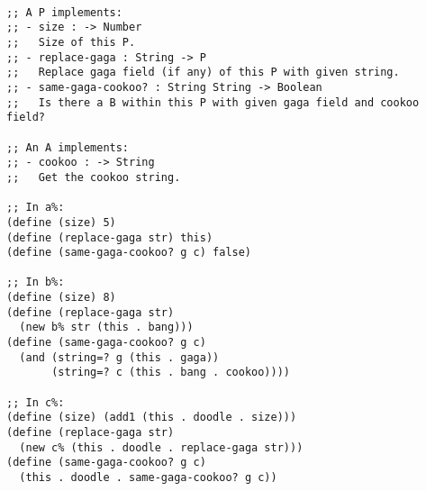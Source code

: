 \documentclass[12pt]{article}                   %
\newenvironment{solution}{}{}
\begin{document}
\begin{problem}
\newpage
\ifrubric{}
\newpage
\fi

\begin{solution}
\begin{verbatim}

;; A P implements:
;; - size : -> Number
;;   Size of this P.
;; - replace-gaga : String -> P
;;   Replace gaga field (if any) of this P with given string.
;; - same-gaga-cookoo? : String String -> Boolean
;;   Is there a B within this P with given gaga field and cookoo field?

;; An A implements:
;; - cookoo : -> String
;;   Get the cookoo string.

;; In a%:
(define (size) 5)
(define (replace-gaga str) this)
(define (same-gaga-cookoo? g c) false)

;; In b%:
(define (size) 8)
(define (replace-gaga str)
  (new b% str (this . bang)))
(define (same-gaga-cookoo? g c)
  (and (string=? g (this . gaga))
       (string=? c (this . bang . cookoo))))

;; In c%:
(define (size) (add1 (this . doodle . size)))
(define (replace-gaga str)
  (new c% (this . doodle . replace-gaga str)))
(define (same-gaga-cookoo? g c)
  (this . doodle . same-gaga-cookoo? g c))

\end{verbatim}
\end{solution}
\end{problem}
\newpage
\end{document}
